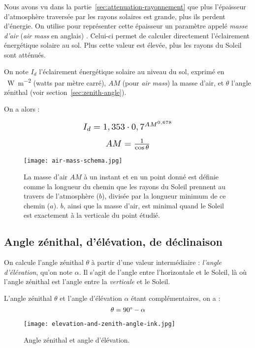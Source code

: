 \documentclass[12pt]{article}
\begin{document}
Nous avons vu dans la partie~\ref{sec:attenuation-rayonnement} que plus l'épaisseur d'atmosphère traversée par les rayons solaires est grande, plus ils perdent d'énergie.
On utilise pour représenter cette épaisseur un paramètre appelé \emph{masse d'air} (\textit{air mass} en anglais) \cite{air_mass_wiki}.
Celui-ci permet de calculer directement l'éclairement énergétique solaire au sol.
Plus cette valeur est élevée, plus les rayons du Soleil sont atténués.

On note $I_d$ l'éclairement énergétique solaire au niveau du sol, exprimé en \SI{}{\watt\per\square\meter} (watts par mètre carré), $AM$ (pour \emph{air mass}) la masse d'air, et $\theta$ l'angle zénithal (voir section~\ref{sec:zenith-angle}).

On a alors \cite{pos_air_mass} :

\[
	\scalebox{1.3}{
		$I_d = 1,353 \cdot 0,7^{{AM}^{0,678}}$
	}
\]

\[
	\scalebox{1.3}{
		$AM = \frac{1}{\cos \theta}$
	}
\]

\begin{figure}[H]
	\centerline{\texttt{[image: air-mass-schema.jpg]}}
	\caption{La masse d'air $AM$ à un instant et en un point donné est définie comme la longueur du chemin que les rayons du Soleil prennent au travers de l'atmosphère ($b$), divisée par la longueur minimum de ce chemin ($a$). $b$, ainsi que la masse d'air, est minimal quand le Soleil est exactement à la verticale du point étudié.}
	\label{fig:air-mass}
\end{figure}


\subsection{Angle zénithal, d'élévation, de déclinaison}
On calcule l'angle zénithal $\theta$ à partir d'une valeur intermédiaire : \emph{l'angle d'élévation}, qu'on note $\alpha$.
Il s'agit de l'angle entre l'horizontale et le Soleil, là où l'angle zénithal est l'angle entre la \emph{verticale} et le Soleil.

L'angle zénithal $\theta$ et l'angle d'élévation $\alpha$ étant complémentaires, on a :
\[
	\theta = 90\degree - \alpha
\]

 \begin{figure}[H]
	\centerline{\texttt{[image: elevation-and-zenith-angle-ink.jpg]}}
	\caption{Angle zénithal et angle d'élévation.}
	\label{fig:elevation-and-zenith-angle}
\end{figure}
\end{document}
